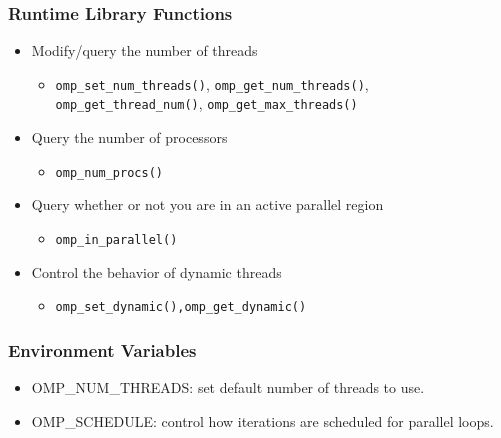 \documentclass[10pt,t]{beamer}
\begin{document}
\begin{frame}
  \frametitle{Runtime Library Functions}
  \begin{itemize}
    \item Modify/query the number of threads
    \begin{itemize}
      \item \texttt{omp\_set\_num\_threads()}, \texttt{omp\_get\_num\_threads()}, \texttt{omp\_get\_thread\_num()}, \texttt{omp\_get\_max\_threads()}
    \end{itemize}
    \item Query the number of processors
    \begin{itemize}
      \item \texttt{omp\_num\_procs()}
    \end{itemize}
    \item Query whether or not you are in an active parallel region
    \begin{itemize}
      \item \texttt{omp\_in\_parallel()}
    \end{itemize}
    \item Control the behavior of dynamic threads
    \begin{itemize}
      \item \texttt{omp\_set\_dynamic(),omp\_get\_dynamic()}
    \end{itemize}
  \end{itemize}
\end{frame}

\begin{frame}
  \frametitle{Environment Variables}
  \begin{itemize}
    \item OMP\_NUM\_THREADS: set default number of threads to use.
    \item OMP\_SCHEDULE: control how iterations are scheduled for parallel loops.
  \end{itemize}
\end{frame}
\end{document}
